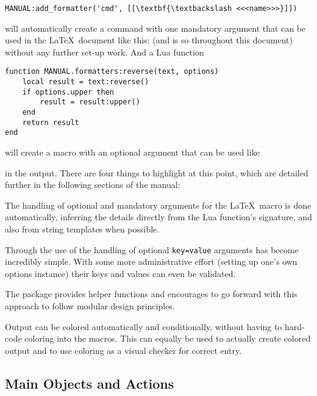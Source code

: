 \documentclass[12pt]{scrartcl}
\begin{document}
\begin{verbatim}
MANUAL:add_formatter('cmd', [[\textbf{\textbackslash <<<name>>>}]])
\end{verbatim}

\noindent will automatically create a command  with one
mandatory argument that can be used in the \LaTeX\ document like this:
 (and is so throughout this
document) without any further set-up work.  And a Lua function

\label{code:function}
\begin{verbatim}
function MANUAL.formatters:reverse(text, options)
    local result = text:reverse()
    if options.upper then
        result = result:upper()
    end
    return result
end
\end{verbatim}

\noindent will create a macro  with an optional
argument that can be used like

%
in the output.  There are four things to highlight at this point, which are
detailed further in the following sections of the manual:

\begin{itemize*}
\item The handling of optional and mandatory arguments for the \LaTeX\ macro is
done automatically, inferring the details directly from the Lua function's signature, and also from string templates when possible.
\item Through the use of  the handling of optional
\texttt{key=value} arguments has become incredibly simple.  With some more
administrative effort (setting up one's own options instance) their keys and
values can even be validated.
\item The package provides helper functions and encourages to go forward with
this approach to follow modular design principles.
\item Output can be colored automatically and conditionally, without having to
hard-code coloring into the macros. This can equally be used to actually create
colored output and to use coloring as a visual checker for correct entry.
\end{itemize*}


\subsection{Main Objects and Actions}
\label{sec:main-objects-and-actions}
\end{document}
